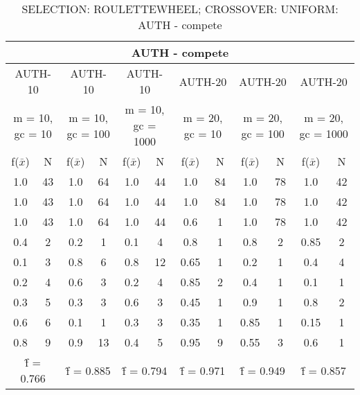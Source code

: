 \begin{table}[H]
	\centering
	\caption{SELECTION: ROULETTEWHEEL; CROSSOVER: UNIFORM: AUTH - compete}
	\begin{adjustbox}{width=1\textwidth}
		\begin{tabular}{ |c|c||c|c||c|c||c|c||c|c||c|c| }
			\hline
			\multicolumn{12}{|c|}{AUTH - compete} \\
			\hline
			\multicolumn{2}{|c||}{AUTH-10} & \multicolumn{2}{c||}{AUTH-10} & \multicolumn{2}{c||}{AUTH-10} & \multicolumn{2}{c||}{AUTH-20} & \multicolumn{2}{c||}{AUTH-20} & \multicolumn{2}{c|}{AUTH-20}\\
			\hline
			\multicolumn{2}{|c||}{m = 10, gc = 10} & \multicolumn{2}{c||}{m = 10, gc = 100} & \multicolumn{2}{c||}{m = 10, gc = 1000} & \multicolumn{2}{c||}{m = 20, gc = 10} & \multicolumn{2}{c||}{m = 20, gc = 100} & \multicolumn{2}{c|}{m = 20, gc = 1000}\\
			\hline
			f($\bar{x}$) & N & f($\bar{x}$) & N & f($\bar{x}$) & N & f($\bar{x}$) & N & f($\bar{x}$) & N & f($\bar{x}$) & N\\
			\hline
			\hline
			1.0 & 43 & 1.0 & 64 & 1.0 & 44 & 1.0 & 84 & 1.0 & 78 & 1.0 & 42\\
			\hline
			1.0 & 43 & 1.0 & 64 & 1.0 & 44 & 1.0 & 84 & 1.0 & 78 & 1.0 & 42\\
			1.0 & 43 & 1.0 & 64 & 1.0 & 44 & 0.6 & 1 & 1.0 & 78 & 1.0 & 42\\
			0.4 & 2 & 0.2 & 1 & 0.1 & 4 & 0.8 & 1 & 0.8 & 2 & 0.85 & 2\\
			0.1 & 3 & 0.8 & 6 & 0.8 & 12 & 0.65 & 1 & 0.2 & 1 & 0.4 & 4\\
			0.2 & 4 & 0.6 & 3 & 0.2 & 4 & 0.85 & 2 & 0.4 & 1 & 0.1 & 1\\
			0.3 & 5 & 0.3 & 3 & 0.6 & 3 & 0.45 & 1 & 0.9 & 1 & 0.8 & 2\\
			0.6 & 6 & 0.1 & 1 & 0.3 & 3 & 0.35 & 1 & 0.85 & 1 & 0.15 & 1\\
			0.8 & 9 & 0.9 & 13 & 0.4 & 5 & 0.95 & 9 & 0.55 & 3 & 0.6 & 1\\
			\hline
			\multicolumn{2}{|c||}{\^{f} = 0.766} & \multicolumn{2}{c||}{\^{f} = 0.885} & \multicolumn{2}{c||}{\^{f} = 0.794} & \multicolumn{2}{c||}{\^{f} = 0.971} & \multicolumn{2}{c||}{\^{f} = 0.949} & \multicolumn{2}{c|}{\^{f} = 0.857}\\
			\hline
		\end{tabular}
	\end{adjustbox}
\end{table}
